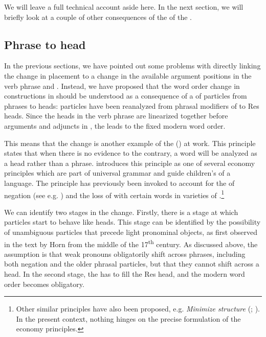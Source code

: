 \documentclass[output=paper]{langscibook}
\begin{document}
We will leave a full technical account aside here. In the next section, we will briefly look at a couple of other consequences of the  of the . 


\subsection{Phrase to head}\label{sec:lalu:6.3}

In the previous sections, we have pointed out some problems with directly linking the change in  placement to a change in the available argument positions in the verb phrase and . Instead, we have proposed that the word order change in  constructions in  should be understood as a consequence of a  of particles from phrases to heads:  particles have been reanalyzed from phrasal modifiers of  to Res heads. Since the heads in the verb phrase are linearized together before arguments and adjuncts in , the  leads to the fixed modern word order. 



This means that the change is another example of the  (\citealt{van_Gelderen2004}) at work. This principle states that when there is no evidence to the contrary, a word will be analyzed as a head rather than a phrase. \citet{van_Gelderen2004} introduces this principle as one of several economy principles which are part of universal grammar and guide children’s  of a language. The principle has previously been invoked to account for the  of negation (see e.g. \citealt{Van_gelderen2008}) and the loss of  with certain  words in varieties of  \citep{WestergaardEtAl2017}.\footnote{Other similar principles have also been proposed, e.g. \textit{Minimize structure} (\citealt{CardinalettiStarke1999}; \citealt{BreitbarthEtAl2020}). In the present context, nothing hinges on the precise formulation of the economy principles.}  



We can identify two stages in the change. Firstly, there is a stage at which particles start to behave like heads. This stage can be identified by the possibility of unambiguous particles that precede light pronominal objects, as first observed in the text by Horn from the middle of the 17\textsuperscript{th} century. As discussed above, the assumption is that weak pronouns obligatorily shift across  phrases, including both negation and the older phrasal particles, but that they cannot shift across a head. In the second stage, the  has to fill the Res head, and the modern word order becomes obligatory. 
\end{document}
